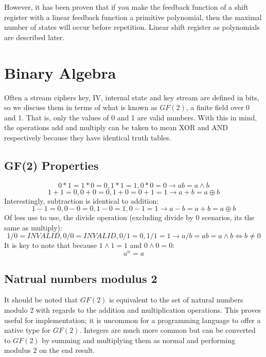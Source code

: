 \documentclass{report}
\let\Oldsection\section
\renewcommand{\section}{\FloatBarrier\Oldsection}
\let\Oldsubsection\subsection
\renewcommand{\subsection}{\FloatBarrier\Oldsubsection}
\begin{document}
However, it has been proven that if you make the feedback function of a shift register with a linear feedback function a primitive polynomial, then the maximal number of states will occur before repetition. Linear shift register as polynomials are described later. %

\section{Binary Algebra}
Often a stream ciphers key, IV, internal state and key stream are defined in bits, so we discuss them in terms of what is known as $\mathit{GF(2)}$, a finite field over 0 and 1. That is, only the values of 0 and 1 are valid numbers. With this in mind, the operations add and multiply can be taken to mean XOR and AND respectively because they have identical truth tables.

\subsection{GF(2) Properties}
\begin{equation} \label{eq:GFtimes}
0*1 = 1*0=0, 1*1=1, 0*0=0 \to ab = a \land b
\end{equation}
\begin{equation} \label{eq:GFadd}
1+1=0, 0+0=0, 1+0=0+1=1 \to a+b = a \oplus b
\end{equation}
Interestingly, subtraction is identical to addition:
\begin{equation} \label{eq:GFminus}
1-1=0, 0-0=0, 1-0=1, 0-1=1 \to a-b = a+b = a \oplus b
\end{equation}
Of less use to use, the divide operation (excluding divide by 0 scenarios, its the same as multiply):
\begin{equation} \label{eq:GFdivide}
1/0=\mathit{INVALID}, 0/0=\mathit{INVALID}, 0/1=0, 1/1=1 \to a/b = ab = a \land b \iff b \neq 0
\end{equation}
It is key to note that because $1\land1=1$ and $0\land0 = 0$:
\begin{equation} \label{eq:GFpowers}
a^n = a
\end{equation}

\subsection{Natrual numbers modulus 2}
It should be noted that $\mathit{GF(2)}$ is equivalent to the set of natural numbers modulo 2 with regards to the addition and multiplication operations. This proves useful for implementation; it is uncommon for a programming language to offer a native type for $\mathit{GF(2)}$. Integers are much more common but can be converted to $\mathit{GF(2)}$ by summing and multiplying them as normal and performing modulus 2 on the end result.
\end{document}
